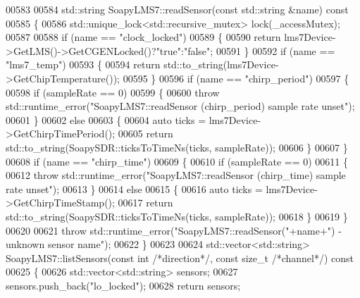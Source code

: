 \begin{DoxyCode}
{{{{{{{{{{{{{{00583 
00584 std::string SoapyLMS7::readSensor(\textcolor{keyword}{const} std::string &name)\textcolor{keyword}{ const}
00585 \textcolor{keyword}{}\{
00586     std::unique\_lock<std::recursive\_mutex> lock(_accessMutex);
00587 
00588     \textcolor{keywordflow}{if} (name == \textcolor{stringliteral}{"clock\_locked"})
00589     \{
00590         \textcolor{keywordflow}{return} lms7Device->GetLMS()->GetCGENLocked()?\textcolor{stringliteral}{"true"}:\textcolor{stringliteral}{"false"};
00591     \}
00592     \textcolor{keywordflow}{if} (name == \textcolor{stringliteral}{"lms7\_temp"})
00593     \{
00594         \textcolor{keywordflow}{return} std::to\_string(lms7Device->GetChipTemperature());
00595     \}
00596     \textcolor{keywordflow}{if} (name == \textcolor{stringliteral}{"chirp\_period"})
00597     \{
00598       \textcolor{keywordflow}{if} (sampleRate == 0)
00599       \{
00600         \textcolor{keywordflow}{throw} std::runtime\_error(\textcolor{stringliteral}{"SoapyLMS7::readSensor (chirp\_period) sample rate unset"});
00601       \}
00602       \textcolor{keywordflow}{else}
00603       \{
00604         \textcolor{keyword}{auto} ticks = lms7Device->GetChirpTimePeriod();
00605         \textcolor{keywordflow}{return} std::to\_string(SoapySDR::ticksToTimeNs(ticks, sampleRate));
00606       \}
00607     \}
00608     \textcolor{keywordflow}{if} (name == \textcolor{stringliteral}{"chirp\_time"})
00609     \{
00610       \textcolor{keywordflow}{if} (sampleRate == 0)
00611       \{
00612         \textcolor{keywordflow}{throw} std::runtime\_error(\textcolor{stringliteral}{"SoapyLMS7::readSensor (chirp\_time) sample rate unset"});
00613       \}
00614       \textcolor{keywordflow}{else}
00615       \{
00616         \textcolor{keyword}{auto} ticks = lms7Device->GetChirpTimeStamp();
00617         \textcolor{keywordflow}{return} std::to\_string(SoapySDR::ticksToTimeNs(ticks, sampleRate));
00618       \}
00619     \}
00620 
00621     \textcolor{keywordflow}{throw} std::runtime\_error(\textcolor{stringliteral}{"SoapyLMS7::readSensor("}+name+\textcolor{stringliteral}{") - unknown sensor name"});
00622 \}
00623 
00624 std::vector<std::string> SoapyLMS7::listSensors(\textcolor{keyword}{const} \textcolor{keywordtype}{int} \textcolor{comment}{/*direction*/}, \textcolor{keyword}{const} \textcolor{keywordtype}{size\_t} \textcolor{comment}{/*channel*/})\textcolor{keyword}{ const}
00625 \textcolor{keyword}{}\{
00626     std::vector<std::string> sensors;
00627     sensors.push\_back(\textcolor{stringliteral}{"lo\_locked"});
00628     \textcolor{keywordflow}{return} sensors;
}}}}}}}}}}}}}}
\end{DoxyCode}
